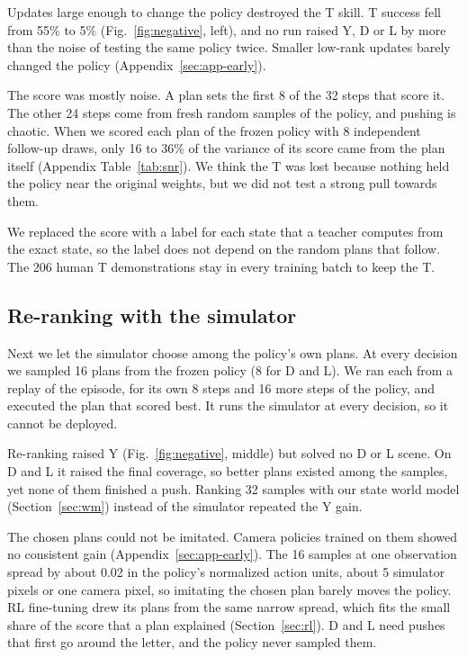 \documentclass[10pt,twocolumn,letterpaper]{article}
\begin{document}
Updates large enough to change the policy destroyed the T skill. T success fell from 55\% to 5\%
(Fig.~\ref{fig:negative}, left), and no run raised Y, D or L by more than the noise of testing the same policy twice.
Smaller low-rank updates barely changed the policy (Appendix~\ref{sec:app-early}).

The score was mostly noise. A plan sets the first 8 of the 32 steps that score it. The other 24 steps come from fresh
random samples of the policy, and pushing is chaotic. When we scored each plan of the frozen policy with 8 independent
follow-up draws, only 16 to 36\% of the variance of its score came from the plan itself (Appendix
Table~\ref{tab:snr}). We think the T was lost because nothing held the policy near the original weights, but we did
not test a strong pull towards them.

We replaced the score with a label for each state that a teacher computes from the exact state, so the label does not
depend on the random plans that follow. The 206 human T demonstrations stay in every training batch to keep the T.

\subsection{Re-ranking with the simulator}
\label{sec:rerank}

Next we let the simulator choose among the policy's own plans. At every decision we sampled 16 plans from the frozen
policy (8 for D and L). We ran each from a replay of the episode, for its own 8 steps and 16 more steps of the policy,
and executed the plan that scored best. It runs the simulator at every decision, so it cannot be deployed.

Re-ranking raised Y (Fig.~\ref{fig:negative}, middle) but solved no D or L scene. On D and L it raised the final
coverage, so better plans existed among the samples, yet none of them finished a push. Ranking 32 samples with our
state world model (Section~\ref{sec:wm}) instead of the simulator repeated the Y gain.

The chosen plans could not be imitated. Camera policies trained on them showed no consistent gain
(Appendix~\ref{sec:app-early}). The 16 samples at one observation spread by about 0.02 in the policy's normalized
action units, about 5 simulator pixels or one camera pixel, so imitating the chosen plan barely moves the policy.
RL fine-tuning drew its plans from the same narrow spread, which fits the small share of the score that a plan explained (Section~\ref{sec:rl}). D and L
need pushes that first go around the letter, and the policy never sampled them.
\end{document}
